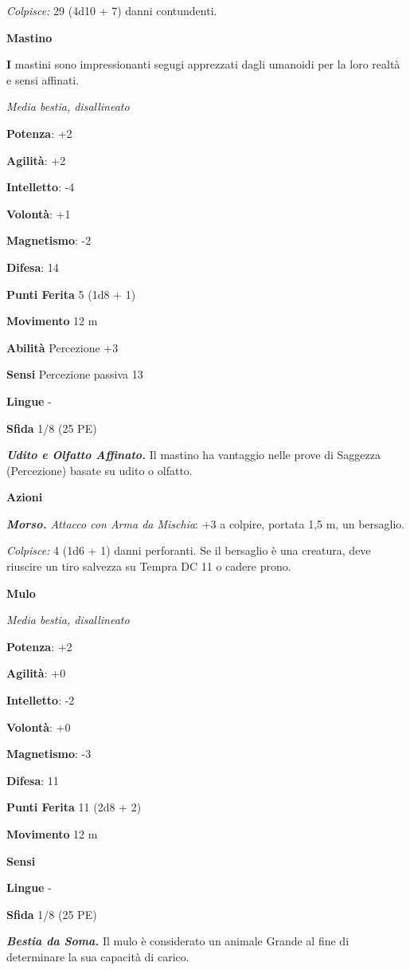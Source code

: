 \begin{multicols}{2}
\emph{Colpisce:} 29 (4d10 + 7) danni contundenti.

\textbf{Mastino}

\textbf{I} mastini sono impressionanti segugi apprezzati dagli umanoidi
per la loro realtà e sensi affinati.

\emph{Media bestia, disallineato}

\textbf{Potenza}: +2

\textbf{Agilità}: +2

\textbf{Intelletto}: -4

\textbf{Volontà}: +1

\textbf{Magnetismo}: -2

\textbf{Difesa}: 14

\textbf{Punti Ferita} 5 (1d8 + 1)

\textbf{Movimento} 12 m

\textbf{Abilità} Percezione +3

\textbf{Sensi} Percezione passiva 13

\textbf{Lingue} -

\textbf{Sfida} 1/8 (25 PE)

\emph{\textbf{Udito e Olfatto Affinato.}} Il mastino ha vantaggio nelle
prove di Saggezza (Percezione) basate su udito o olfatto.

\textbf{Azioni}

\emph{\textbf{Morso.} Attacco con Arma da Mischia}: +3 a colpire,
portata 1,5 m, un bersaglio.

\emph{Colpisce:} 4 (1d6 + 1) danni perforanti. Se il bersaglio è una
creatura, deve riuscire un tiro salvezza su Tempra DC 11 o cadere prono.

\textbf{Mulo}

\emph{Media bestia, disallineato}

\textbf{Potenza}: +2

\textbf{Agilità}: +0

\textbf{Intelletto}: -2

\textbf{Volontà}: +0

\textbf{Magnetismo}: -3

\textbf{Difesa}: 11

\textbf{Punti Ferita} 11 (2d8 + 2)

\textbf{Movimento} 12 m

\textbf{Sensi} 

\textbf{Lingue} -

\textbf{Sfida} 1/8 (25 PE)

\emph{\textbf{Bestia da Soma.}} Il mulo è considerato un animale Grande
al fine di determinare la sua capacità di carico.


\end{multicols}
